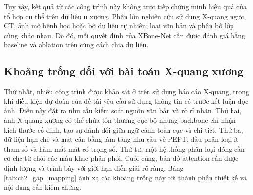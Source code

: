 Tuy vậy, kết quả từ các công trình này không trực tiếp chứng minh hiệu quả của tổ hợp cụ thể trên dữ liệu u xương. Phần lớn nghiên cứu sử dụng X-quang ngực, CT, ảnh mô bệnh học hoặc bộ dữ liệu tự nhiên; loại văn bản và phân bố lớp cũng khác nhau. Do đó, mỗi quyết định của XBone-Net cần được đánh giá bằng baseline và ablation trên cùng cách chia dữ liệu.

\subsection{Khoảng trống đối với bài toán X-quang xương}

Thứ nhất, nhiều công trình được khảo sát ở trên sử dụng báo cáo X-quang, trong khi điều kiện dự đoán của đề tài yêu cầu sử dụng thông tin có trước kết luận đọc ảnh. Điều này đặt ra nhu cầu kiểm soát nguồn văn bản và rò rỉ nhãn. Thứ hai, ảnh X-quang xương có thể chứa tổn thương cục bộ nhưng backbone chỉ nhận kích thước cố định, tạo sự đánh đổi giữa ngữ cảnh toàn cục và chi tiết. Thứ ba, dữ liệu hạn chế và mất cân bằng làm tăng nhu cầu về PEFT, đầu phân loại ít tham số và hàm mất mát có trọng số. Thứ tư, một hệ thống phân loại đóng cần cơ chế từ chối các mẫu khác phân phối. Cuối cùng, bản đồ attention cần được định lượng và trình bày với giới hạn diễn giải rõ ràng. Bảng \ref{tab:ch2_gap_mapping} ánh xạ các khoảng trống này tới thành phần thiết kế và nội dung cần kiểm chứng.

